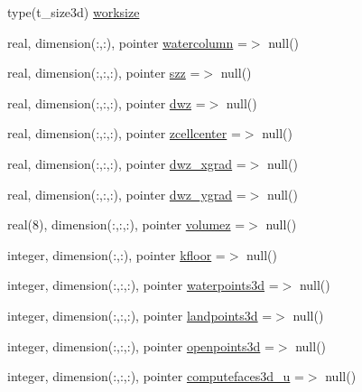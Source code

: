 \begin{DoxyCompactItemize}
\item 
type(t\+\_\+size3d) \mbox{\hyperlink{structmodulelagrangianglobal_1_1t__eulermodel_a87dd442a598ec3774e01680fe7fa52f9}{worksize}}
\item 
real, dimension(\+:,\+:), pointer \mbox{\hyperlink{structmodulelagrangianglobal_1_1t__eulermodel_a3e052aebb0bcb527973ca5e7bd4eca22}{watercolumn}} =$>$ null()
\item 
real, dimension(\+:,\+:,\+:), pointer \mbox{\hyperlink{structmodulelagrangianglobal_1_1t__eulermodel_aa1c28b5b5b937bf93bf51c25b3bc4073}{szz}} =$>$ null()
\item 
real, dimension(\+:,\+:,\+:), pointer \mbox{\hyperlink{structmodulelagrangianglobal_1_1t__eulermodel_af4d866f4a8cf7e791aa9d0390ddc81f5}{dwz}} =$>$ null()
\item 
real, dimension(\+:,\+:,\+:), pointer \mbox{\hyperlink{structmodulelagrangianglobal_1_1t__eulermodel_add3e02d1516db39f83bfba09b6892b92}{zcellcenter}} =$>$ null()
\item 
real, dimension(\+:,\+:,\+:), pointer \mbox{\hyperlink{structmodulelagrangianglobal_1_1t__eulermodel_a3137a9a5b7ba0e5f1c31a7f001491a04}{dwz\+\_\+xgrad}} =$>$ null()
\item 
real, dimension(\+:,\+:,\+:), pointer \mbox{\hyperlink{structmodulelagrangianglobal_1_1t__eulermodel_a8c5e3d8a0a5e35f7c6c48a97f2c7f0b6}{dwz\+\_\+ygrad}} =$>$ null()
\item 
real(8), dimension(\+:,\+:,\+:), pointer \mbox{\hyperlink{structmodulelagrangianglobal_1_1t__eulermodel_a16bc135216b5503b926e786c05d0b5df}{volumez}} =$>$ null()
\item 
integer, dimension(\+:,\+:), pointer \mbox{\hyperlink{structmodulelagrangianglobal_1_1t__eulermodel_ae24358001770e08146e17b6e7b0ba3a1}{kfloor}} =$>$ null()
\item 
integer, dimension(\+:,\+:,\+:), pointer \mbox{\hyperlink{structmodulelagrangianglobal_1_1t__eulermodel_a07139a34d1106e0dc60ba82dc87f04c4}{waterpoints3d}} =$>$ null()
\item 
integer, dimension(\+:,\+:,\+:), pointer \mbox{\hyperlink{structmodulelagrangianglobal_1_1t__eulermodel_a72a8aa483f476c082ba77db81b043d96}{landpoints3d}} =$>$ null()
\item 
integer, dimension(\+:,\+:,\+:), pointer \mbox{\hyperlink{structmodulelagrangianglobal_1_1t__eulermodel_adaf42d0befeff32614cae2988ce33bfb}{openpoints3d}} =$>$ null()
\item 
integer, dimension(\+:,\+:,\+:), pointer \mbox{\hyperlink{structmodulelagrangianglobal_1_1t__eulermodel_a39ebb91fed1e65bab4fa81d0ed43971b}{computefaces3d\+\_\+u}} =$>$ null()

\end{DoxyCompactItemize}
